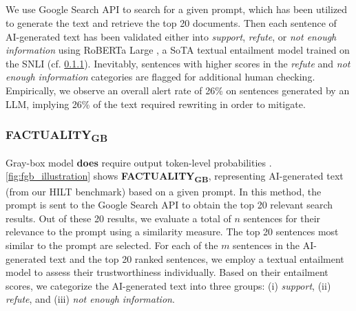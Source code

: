 

\vspace{-1mm}
\subsection{}
We use Google Search API \cite{googlesearchapi} to search for a given prompt, which has been utilized to generate the text and retrieve the top 20 documents. Then each sentence of AI-generated text has been validated either into \emph{support}, \emph{refute}, or \emph{not enough information} using RoBERTa Large \cite{liu2019roberta}, a SoTA textual entailment model trained on the SNLI \cite{bowman2015snli} (cf. \cref{app:gb}). Inevitably, sentences with higher scores in the \emph{refute} and \emph{not enough information} categories are flagged for additional human checking. Empirically, we observe an overall alert rate of 26\% on sentences generated by an LLM, implying 26\% of the text required rewriting in order to mitigate.



\subsubsection{FACTUALITY\textsubscript{GB}}
\label{app:gb}
Gray-box model \textbf{does} require output token-level probabilities \cite{manakul2023selfcheckgpt}. \cref{fig:fgb_illustration} shows \textbf{FACTUALITY\textsubscript{GB}}, representing AI-generated text (from our HILT benchmark) based on a given prompt. In this method, the prompt is sent to the Google Search API to obtain the top 20 relevant search results. Out of these 20 results, we evaluate a total of $n$ sentences for their relevance to the prompt using a similarity measure. The top 20 sentences most similar to the prompt are selected. For each of the $m$ sentences in the AI-generated text and the top 20 ranked sentences, we employ a textual entailment model to assess their trustworthiness individually. Based on their entailment scores, we categorize the AI-generated text into three groups: (i) \textit{support}, (ii) \textit{refute}, and (iii) \textit{not enough information}.


